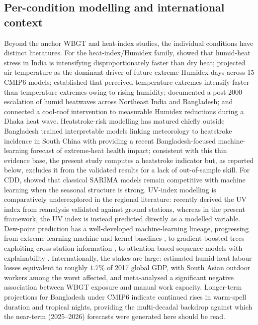 \documentclass[pdflatex,sn-basic,lineno]{sn-jnl}
\begin{document}
\subsection{Per-condition modelling and international context}
Beyond the anchor WBGT and heat-index studies, the individual conditions have
distinct literatures. For the heat-index/Humidex family, \citet{sojan2024humidheat}
showed that humid-heat stress in India is intensifying disproportionately faster
than dry heat; \citet{kushwaha2026humidex} projected air temperature as the
dominant driver of future extreme-Humidex days across 15 CMIP6 models;
\citet{scoccimarro2017humidity} established that perceived-temperature extremes
intensify faster than temperature extremes owing to rising humidity;
\citet{saha2025postescalation} documented a post-2000 escalation of humid heatwaves
across Northeast India and Bangladesh; and \citet{tabassum2025coolroofs} connected
a cool-roof intervention to measurable Humidex reductions during a Dhaka heat wave.
Heatstroke-risk modelling has matured chiefly outside Bangladesh %
\citet{xuh2024heatstroke} trained interpretable models linking meteorology to
heatstroke incidence in South China with \citet{ehsan2026extremeheat} providing a
recent Bangladesh-focused machine-learning forecast of extreme-heat health impact;
consistent with this thin evidence base, the present study computes a heatstroke
indicator but, as reported below, excludes it from the validated results for a lack
of out-of-sample skill. For CDD, \citet{bilgili2023cdd} showed that classical
SARIMA models remain competitive with machine learning when the seasonal structure
is strong. UV-index modelling is comparatively underexplored in the regional
literature: \citet{teggi2026uvindex} recently derived the UV index from reanalysis
validated against ground stations, whereas in the present framework, the UV index is
instead predicted directly as a modelled variable. Dew-point prediction has a
well-developed machine-learning lineage, progressing from extreme-learning-machine
and kernel baselines \citep{mohammadi2015elm,qasem2019dewpoint}, to gradient-boosted
trees exploiting cross-station information \citep{yao2022catboost}, to
attention-based sequence models with explainability \citep{abdullah2025xai}.
Internationally, the stakes are large: \citet{parsons2021labor} estimated humid-heat
labour losses equivalent to roughly $1.7\%$ of 2017 global GDP, with South Asian
outdoor workers among the worst affected, and \citet{flouris2022} meta-analysed a
significant negative association between WBGT exposure and manual work capacity.
Longer-term projections for Bangladesh under CMIP6 \citep{khatun2024} indicate
continued rises in warm-spell duration and tropical nights, providing the
multi-decadal backdrop against which the near-term (2025--2026) forecasts were generated here should be read.
\end{document}
